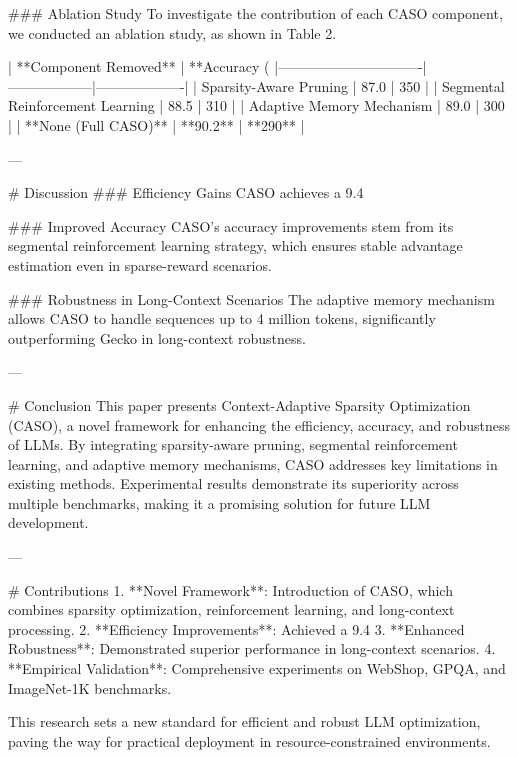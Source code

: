 ### Ablation Study  
To investigate the contribution of each CASO component, we conducted an ablation study, as shown in Table 2.

| **Component Removed**        | **Accuracy (%
|-------------------------------|------------------|-------------------|  
| Sparsity-Aware Pruning        | 87.0             | 350               |  
| Segmental Reinforcement Learning | 88.5             | 310               |  
| Adaptive Memory Mechanism     | 89.0             | 300               |  
| **None (Full CASO)**          | **90.2**         | **290**           |  

---

# Discussion  
### Efficiency Gains  
CASO achieves a 9.4%

### Improved Accuracy  
CASO's accuracy improvements stem from its segmental reinforcement learning strategy, which ensures stable advantage estimation even in sparse-reward scenarios.

### Robustness in Long-Context Scenarios  
The adaptive memory mechanism allows CASO to handle sequences up to 4 million tokens, significantly outperforming Gecko in long-context robustness.

---

# Conclusion  
This paper presents Context-Adaptive Sparsity Optimization (CASO), a novel framework for enhancing the efficiency, accuracy, and robustness of LLMs. By integrating sparsity-aware pruning, segmental reinforcement learning, and adaptive memory mechanisms, CASO addresses key limitations in existing methods. Experimental results demonstrate its superiority across multiple benchmarks, making it a promising solution for future LLM development.

---

# Contributions  
1. **Novel Framework**: Introduction of CASO, which combines sparsity optimization, reinforcement learning, and long-context processing.  
2. **Efficiency Improvements**: Achieved a 9.4%
3. **Enhanced Robustness**: Demonstrated superior performance in long-context scenarios.  
4. **Empirical Validation**: Comprehensive experiments on WebShop, GPQA, and ImageNet-1K benchmarks.  

This research sets a new standard for efficient and robust LLM optimization, paving the way for practical deployment in resource-constrained environments.